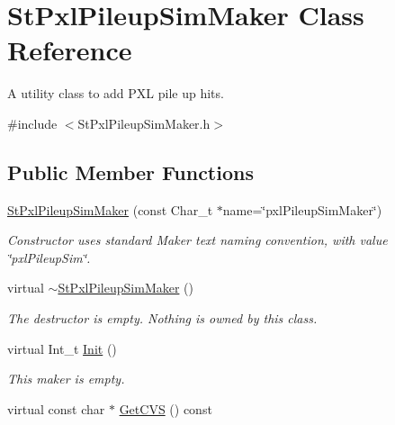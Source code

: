 \hypertarget{classStPxlPileupSimMaker}{\section{St\-Pxl\-Pileup\-Sim\-Maker Class Reference}
\label{classStPxlPileupSimMaker}
}


A utility class to add P\-X\-L pile up hits.  




{\ttfamily \#include $<$St\-Pxl\-Pileup\-Sim\-Maker.\-h$>$}

\subsection*{Public Member Functions}
\begin{DoxyCompactItemize}
\item 
\hypertarget{classStPxlPileupSimMaker_a90a5bd408a346c627983b1d760aa7b8e}{\hyperlink{classStPxlPileupSimMaker_a90a5bd408a346c627983b1d760aa7b8e}{St\-Pxl\-Pileup\-Sim\-Maker} (const Char\-\_\-t $\ast$name=\char`\"{}pxl\-Pileup\-Sim\-Maker\char`\"{})}\label{classStPxlPileupSimMaker_a90a5bd408a346c627983b1d760aa7b8e}

\begin{DoxyCompactList}\small\item\em Constructor uses standard Maker text naming convention, with value \char`\"{}pxl\-Pileup\-Sim\char`\"{}. \end{DoxyCompactList}\item 
\hypertarget{classStPxlPileupSimMaker_ac65df3d640156800c2b2a3bfe06f30c8}{virtual \hyperlink{classStPxlPileupSimMaker_ac65df3d640156800c2b2a3bfe06f30c8}{$\sim$\-St\-Pxl\-Pileup\-Sim\-Maker} ()}\label{classStPxlPileupSimMaker_ac65df3d640156800c2b2a3bfe06f30c8}

\begin{DoxyCompactList}\small\item\em The destructor is empty. Nothing is owned by this class. \end{DoxyCompactList}\item 
virtual Int\-\_\-t \hyperlink{classStPxlPileupSimMaker_a0923a75b3c0e5a1cfc33d765a1d93dee}{Init} ()
\begin{DoxyCompactList}\small\item\em This maker is empty. \end{DoxyCompactList}\item 
\hypertarget{classStPxlPileupSimMaker_a3810d9c9390682d5dd639b555e7f3dd0}{virtual const char $\ast$ \hyperlink{classStPxlPileupSimMaker_a3810d9c9390682d5dd639b555e7f3dd0}{Get\-C\-V\-S} () const }\label{classStPxlPileupSimMaker_a3810d9c9390682d5dd639b555e7f3dd0}


\end{DoxyCompactItemize}
